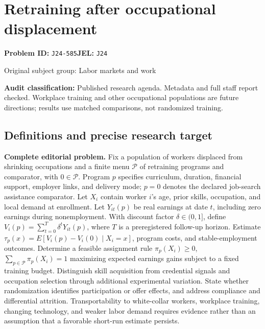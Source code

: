 \documentclass[11pt,a4paper]{article}
\begin{document}
\section*{Retraining after occupational displacement}
\textbf{Problem ID:} \texttt{J24-585}\quad \textbf{JEL:} \texttt{J24}\par
\label{problem:OP-0353}
{\sffamily\small\color{muted}Original subject group: Labor markets and work\par}
\label{definitions:problem:30007635}
\textbf{Audit classification:} Published research agenda. Metadata and full staff report checked. Workplace training and other occupational populations are future directions; results use matched comparisons, not randomized training.
\subsection*{Definitions and precise research target}
\textbf{Complete editorial problem.} Fix a population of workers displaced from shrinking occupations and a finite menu \(\mathcal P\) of retraining programs and comparator, with \(0\in\mathcal P\). Program \(p\) specifies curriculum, duration, financial support, employer links, and delivery mode; \(p=0\) denotes the declared job-search assistance comparator. Let \(X_i\) contain worker \(i\)'s age, prior skills, occupation, and local demand at enrollment. Let \(Y_{it}(p)\) be real earnings at date \(t\), including zero earnings during nonemployment. With discount factor \(\delta\in(0,1]\), define \(V_i(p)=\sum_{t=0}^{T}\delta^tY_{it}(p)\), where \(T\) is a preregistered follow-up horizon. Estimate \(\tau_p(x)=E[V_i(p)-V_i(0)\mid X_i=x]\), program costs, and stable-employment outcomes. Determine a feasible assignment rule \(\pi_p(X_i)\ge0\), \(\sum_{p\in\mathcal P}\pi_p(X_i)=1\) maximizing expected earnings gains subject to a fixed training budget. Distinguish skill acquisition from credential signals and occupation selection through additional experimental variation. State whether randomization identifies participation or offer effects, and address compliance and differential attrition. Transportability to white-collar workers, workplace training, changing technology, and weaker labor demand requires evidence rather than an assumption that a favorable short-run estimate persists.
\end{document}
